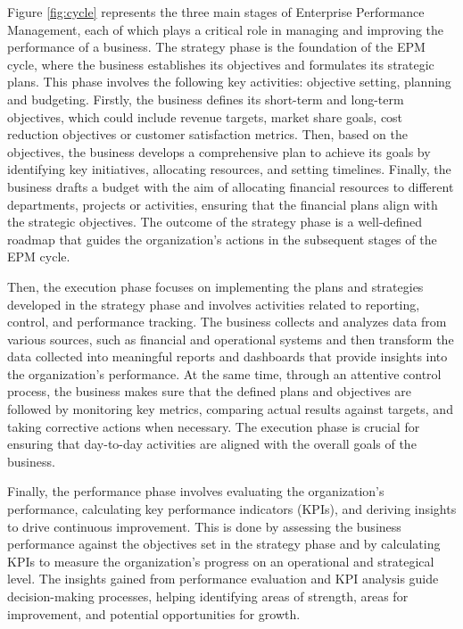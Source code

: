 \documentclass[12pt,a4paper,openright,twoside]{book}
\begin{document}
Figure \ref{fig:cycle} represents the three main stages of Enterprise Performance Management, each of which plays a critical role in managing and improving the performance of a business. 
%
The strategy phase is the foundation of the EPM cycle, where the business establishes its objectives and formulates its strategic plans. 
%
This phase involves the following key activities: objective setting, planning and budgeting.
%
Firstly, the business defines its short-term and long-term objectives, which could include revenue targets, market share goals, cost reduction objectives or customer satisfaction metrics.
%
Then, based on the objectives, the business develops a comprehensive plan to achieve its goals by identifying key initiatives, allocating resources, and setting timelines.
%
Finally, the business drafts a budget with the aim of allocating financial resources to different departments, projects or activities, ensuring that the financial plans align with the strategic objectives.
%
The outcome of the strategy phase is a well-defined roadmap that guides the organization's actions in the subsequent stages of the EPM cycle.

Then, the execution phase focuses on implementing the plans and strategies developed in the strategy phase and involves activities related to reporting, control, and performance tracking.
%
The business collects and analyzes data from various sources, such as financial and operational systems and then transform the data collected into meaningful reports and dashboards that provide insights into the organization's performance.
%
At the same time, through an attentive control process, the business makes sure that the defined plans and objectives are followed by monitoring key metrics, comparing actual results against targets, and taking corrective actions when necessary.
%
The execution phase is crucial for ensuring that day-to-day activities are aligned with the overall goals of the business.

Finally, the performance phase involves evaluating the organization's performance, calculating key performance indicators (KPIs), and deriving insights to drive continuous improvement. 
%
This is done by assessing the business performance against the objectives set in the strategy phase and by calculating KPIs to measure the organization's progress on an operational and strategical level.
%
The insights gained from performance evaluation and KPI analysis guide decision-making processes, helping identifying areas of strength, areas for improvement, and potential opportunities for growth.
\end{document}
